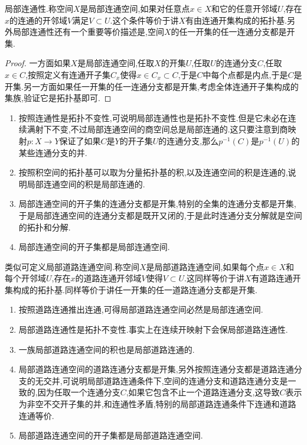 局部连通性.称空间$X$是局部连通空间,如果对任意点$x\in X$和它的任意开邻域$U$,存在$x$的连通的开邻域$V$满足$V\subset U$.这个条件等价于讲$X$有由连通开集构成的拓扑基.另外局部连通性还有一个重要等价描述是,空间$X$的任一开集的任一连通分支都是开集.
\begin{proof}
	
	一方面如果$X$是局部连通空间,任取$X$的开集$U$,任取$U$的连通分支$C$,任取$x\in C$,按照定义有连通开子集$C_x$使得$x\in C_x\subset C$,于是$C$中每个点都是内点,于是$C$是开集.另一方面如果任一开集的任一连通分支都是开集,考虑全体连通开子集构成的集族,验证它是拓扑基即可.
\end{proof}
\begin{enumerate}
	\item 按照连通性是拓扑不变性,可说明局部连通性也是拓扑不变性.但是它未必在连续满射下不变,不过局部连通空间的商空间总是局部连通的.这只要注意到商映射$p:X\to Y$保证了如果$C$是$Y$的开子集$U$的连通分支,那么$p^{-1}(C)$是$p^{-1}(U)$的某些连通分支的并.
	\item 按照积空间的拓扑基可以取为分量拓扑基的积,以及连通空间的积是连通的,说明局部连通空间的积是局部连通的.
	\item 局部连通空间的开子集的连通分支都是开集,特别的全集的连通分支都是开集,于是局部连通空间的连通分支都是既开又闭的,于是此时连通分支分解就是空间的拓扑和分解.
	\item 局部连通空间的开子集都是局部连通空间.
\end{enumerate}

类似可定义局部道路连通空间.称空间$X$是局部道路连通空间,如果每个点$x\in X$和每个开邻域$U$,存在$x$的道路连通开邻域$V$使得$V\subset U$.这同样等价于讲$X$有道路连通开集构成的拓扑基.同样等价于讲任一开集的任一道路连通分支都是开集.
\begin{enumerate}
	\item 按照道路连通推出连通,可得局部道路连通空间必然是局部连通空间.
	\item 局部道路连通性是拓扑不变性.事实上在连续开映射下会保局部道路连通性.
	\item 一族局部道路连通空间的积也是局部道路连通的.
	\item 局部道路连通空间的道路连通分支都是开集,另外按照连通分支都是道路连通分支的无交并,可说明局部道路连通条件下,空间的连通分支和道路连通分支是一致的,因为任取一个连通分支$C$,如果它包含不止一个道路连通分支,这导致$C$表示为非空不交开子集的并,和连通性矛盾,特别的局部道路连通条件下连通和道路连通等价.
	\item 局部道路连通空间的开子集都是局部道路连通空间.
\end{enumerate}

